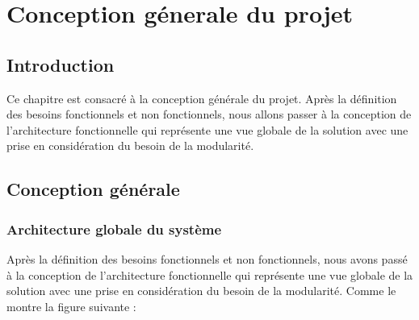 \chapter{Conception g\'enerale du projet}

\section{Introduction}
Ce chapitre est consacr\'e \`a la conception g\'en\'erale du projet. Apr\`es la d\'efinition des besoins fonctionnels et non fonctionnels, nous allons passer \`a la conception de l'architecture fonctionnelle qui repr\'esente une vue globale de la solution avec une prise en consid\'eration du besoin de la modularit\'e. 

\section{Conception g\'en\'erale}


\subsection{Architecture globale du syst\`eme}

Apr\`es la d\'efinition des besoins fonctionnels et non fonctionnels, nous avons pass\'e \`a la conception de l'architecture fonctionnelle qui repr\'esente une vue globale de la solution avec une prise en consid\'eration du besoin de la modularit\'e. Comme le montre la figure suivante :

